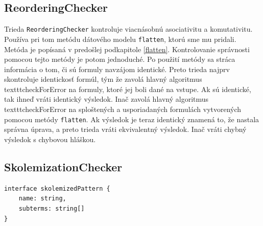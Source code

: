 \subsection{ReorderingChecker}

Trieda \texttt{ReorderingChecker} kontroluje viacnásobnú asociativitu a komutativitu. Používa pri tom metódu dátového modelu \texttt{flatten}, ktorú sme mu pridali. Metóda je popísaná v predošlej podkapitole \eqref{flatten}. Kontrolovanie správnosti pomocou tejto metódy je potom jednoduché. Po použití metódy sa stráca informácia o tom, či sú formuly navzájom identické. Preto trieda najprv skontroluje identickosť formúl, tým že zavolá hlavný algoritmus texttt{checkForError} na formuly, ktoré jej boli dané na vstupe. Ak sú identické, tak ihneď vráti identický výsledok. Inač zavolá hlavný algoritmus texttt{checkForError} na sploštených a usporiadaných formulách vytvorených pomocou metódy \texttt{flatten}. Ak výsledok je teraz identický znamená to, že nastala správna úprava, a preto trieda vráti ekvivalentný výsledok. Inač vráti chybný výsledok s chybovou hláškou.


\subsection{SkolemizationChecker}

\begin{lstlisting}[float,caption={Interface skolemizedPattern},label=skolemizedPattern]
interface skolemizedPattern {
    name: string,
    subterms: string[]
}
\end{lstlisting}

